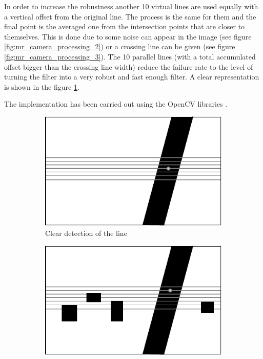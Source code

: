 	In order to increase the robustness another 10 virtual lines are used equally with a vertical offset from the original line.
	The process is the same for them and the final point is the averaged one from the intersection points that are closer to themselves.
	This is done due to some noise can appear in the image (see figure \ref{fig:mr_camera_processing_2}) or a crossing line can be given (see figure \ref{fig:mr_camera_processing_3}).
	The 10 parallel lines (with a total accumulated offset bigger than the crossing line width) reduce the failure rate to the level of turning the filter into a very robust and fast enough filter.
	A clear representation is shown in the figure \ref{fig:mr_camera_processing_1}.

	The implementation has been carried out using the OpenCV libraries \cite{opencv}.
		\begin{figure}
	        \centering
	        \begin{subfigure}[ht!]{0.296\textwidth}
	            \includegraphics[width=\textwidth]{figs/mr_camera_processing_1}
	            \caption{Clear detection of the line}
	            \label{fig:mr_camera_processing_1}
	        \end{subfigure}
	        \hspace{40pt}
	        \begin{subfigure}[ht!]{0.296\textwidth}
	            \includegraphics[width=\textwidth]{figs/mr_camera_processing_2}

\end{subfigure}
\end{figure}
